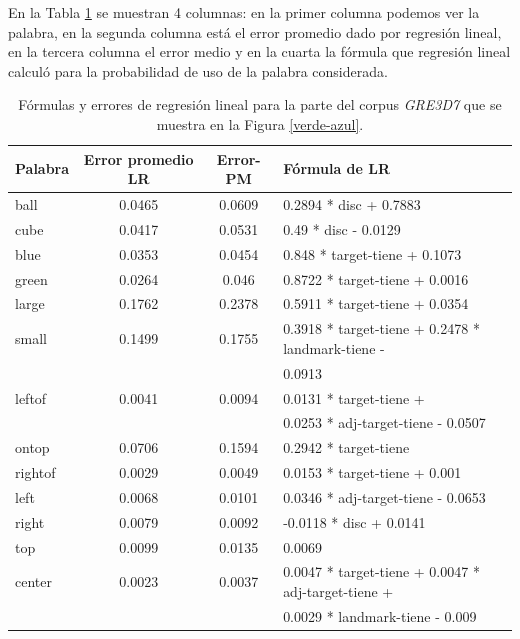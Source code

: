 En la Tabla \ref{tabla-linear-regresion-all} se muestran 4 columnas: en la primer columna podemos ver la palabra, 
en la segunda columna est\'a el error promedio dado por regresi\'on lineal, en la tercera columna el error medio 
y en la cuarta la f\'ormula que regresi\'on lineal calcul\'o para la probabilidad de uso de la palabra considerada.

\begin{table}[h]
\begin{center}
\begin{tabular}{|l|c|c|l|}
\hline
Palabra &Error promedio	LR	& Error-PM	& F\'ormula de LR\\
\hline
ball		 &0.0465   &0.0609	  & 0.2894 * disc + 0.7883\\
\hline
cube		 &0.0417	 &0.0531	  &0.49   * disc - 0.0129\\
\hline
\hline
blue		 &0.0353	 &0.0454	  &0.848  * target-tiene + 0.1073\\
\hline
green		 &0.0264	 &0.046	    &0.8722 * target-tiene + 0.0016\\
\hline
\hline
large		 &0.1762	 &0.2378	  &0.5911 * target-tiene + 0.0354\\
\hline
small		 &0.1499	 &0.1755	  &0.3918 * target-tiene + 0.2478 * landmark-tiene -\\
				 &				 &					&0.0913\\
\hline
\hline
leftof  &0.0041	 &0.0094	  &0.0131 * target-tiene +\\
				 &				 &					&0.0253 * adj-target-tiene - 0.0507\\
\hline
ontop	 &0.0706	 &0.1594	  &0.2942 * target-tiene \\
\hline
rightof &0.0029	 &0.0049	  &0.0153 * target-tiene + 0.001\\
\hline
\hline
left		 &0.0068	 &0.0101	  &0.0346 * adj-target-tiene - 0.0653\\
\hline
right		 &0.0079	 &0.0092	  &-0.0118 * disc + 0.0141\\
\hline
top    &0.0099 	 &0.0135		& 0.0069\\
\hline
center	 &0.0023	 &0.0037	  &0.0047 * target-tiene + 0.0047 * adj-target-tiene +\\
				 &				 &					&0.0029 * landmark-tiene - 0.009\\
\hline
\end{tabular}
\caption{F\'ormulas y errores de regresi\'on lineal para la parte del corpus \textit{GRE3D7} que se muestra en la Figura \ref{verde-azul}.}
\label{tabla-linear-regresion-all}
\end{center}
\end{table}

